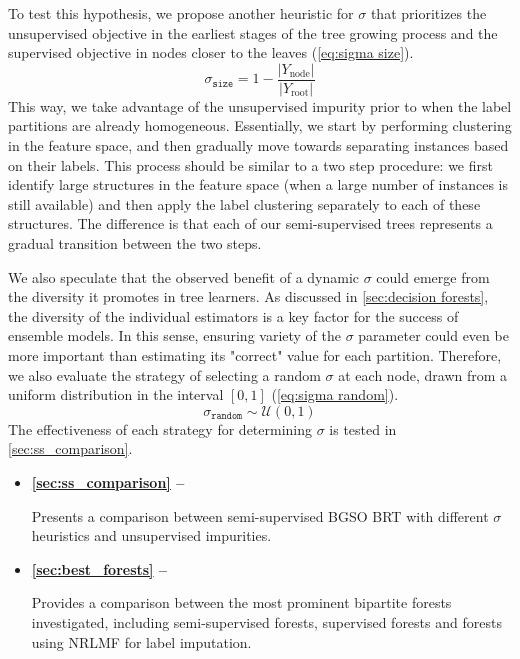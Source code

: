 To test this hypothesis, we propose another heuristic for $\sigma$ that prioritizes the unsupervised objective in the earliest stages of the tree growing process and the supervised objective in nodes closer to the leaves (\autoref{eq:sigma size}).
%
\begin{equation}
    \sigma_\texttt{size} = 1 - \frac{|Y_\text{node}|}{|Y_\text{root}|}
    \label{eq:sigma size}
\end{equation}
%
This way, we take advantage of the unsupervised impurity prior to when the label partitions are already homogeneous. Essentially, we start by performing clustering in the feature space, and then gradually move towards separating instances based on their labels.
This process should be similar to a two step procedure: we first identify large structures in the feature space (when a large number of instances is still available) and then apply the label clustering separately to each of these structures. The difference is that each of our semi-supervised trees represents a gradual transition between the two steps.

We also speculate that the observed benefit of a dynamic $\sigma$ could emerge from the diversity it promotes in tree learners. As discussed in \autoref{sec:decision forests}, the diversity of the individual estimators is a key factor for the success of ensemble models. In this sense, ensuring variety of the $\sigma$ parameter could even be more important than estimating its "correct" value for each partition. Therefore, we also evaluate the strategy of selecting a random $\sigma$ at each node, drawn from a uniform distribution in the interval $[0, 1]$ (\autoref{eq:sigma random}).
%
\begin{equation}
    \sigma_\texttt{random} \sim \mathcal{U}(0, 1)
    \label{eq:sigma random}
\end{equation}
%
The effectiveness of each strategy for determining $\sigma$ is tested in \autoref{sec:ss_comparison}.

\begin{mdframed}[frametitle={Related experiments}]

   \begin{itemize}
    \item \textbf{\autoref{sec:ss_comparison} -- }

    Presents a comparison between semi-supervised BGSO BRT with different $\sigma$ heuristics and unsupervised impurities.

    \item \textbf{\autoref{sec:best_forests} -- }

    Provides a comparison between the most prominent bipartite forests investigated, including semi-supervised forests, supervised forests and forests using NRLMF for label imputation.

   \end{itemize}
\end{mdframed}




